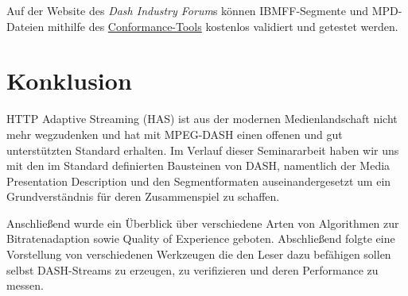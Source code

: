 \documentclass[paper = a4, fontsize = 12pt, parskip = half]{scrartcl} %
\begin{document}
Auf der Website des \textit{Dash Industry Forum}s können IBMFF-Segmente und MPD-Dateien mithilfe des \hyperref{https://conformance.dashif.org/}{}{}{Conformance-Tools} kostenlos validiert und getestet werden.

\section{Konklusion}
HTTP Adaptive Streaming (HAS) ist aus der modernen Medienlandschaft nicht mehr wegzudenken und hat mit MPEG-DASH einen offenen und gut unterstützten Standard erhalten. Im Verlauf dieser Seminararbeit haben wir uns mit den im Standard definierten Bausteinen von DASH, namentlich der Media Presentation Description und den Segmentformaten auseinandergesetzt um ein Grundverständnis für deren Zusammenspiel zu schaffen.

Anschließend wurde ein Überblick über verschiedene Arten von Algorithmen zur Bitratenadaption sowie Quality of Experience geboten. Abschließend folgte eine Vorstellung von verschiedenen Werkzeugen die den Leser dazu befähigen sollen selbst DASH-Streams zu erzeugen, zu verifizieren und deren Performance zu messen.


\newpage
\printbibliography
\end{document}
